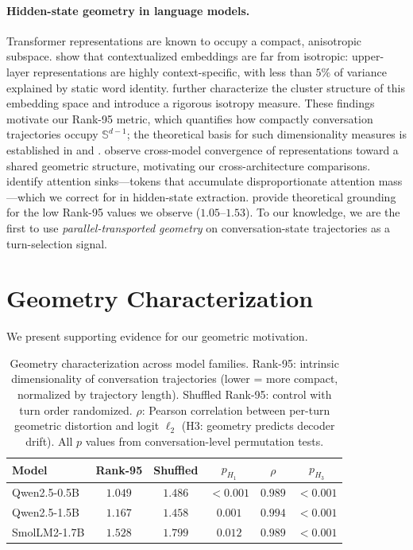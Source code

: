 \documentclass[11pt]{article}
\begin{document}
\paragraph{Hidden-state geometry in language models.}
Transformer representations are known to occupy a compact, anisotropic subspace.
\citet{ethayarajh-2019-contextual} show that contextualized embeddings are far
from isotropic: upper-layer representations are highly context-specific,
with less than $5\%$ of variance explained by static word identity.
\citet{cai-etal-2021-isotropy} further characterize the cluster structure of
this embedding space and introduce a rigorous isotropy measure.
These findings motivate our Rank-95 metric, which quantifies how compactly
conversation trajectories occupy $\mathbb{S}^{d-1}$;
the theoretical basis for such dimensionality measures is established in
\citet{li-etal-2018-measuring} and \citet{aghajanyan-etal-2021-intrinsic}.
\citet{huh-etal-2024-platonic} observe cross-model convergence of representations
toward a shared geometric structure, motivating our cross-architecture comparisons.
\citet{xiao-etal-2023-efficient} identify attention sinks---tokens that
accumulate disproportionate attention mass---which we correct for in
hidden-state extraction.
\citet{anagnostidis-etal-2022-signal} provide theoretical grounding
for the low Rank-95 values we observe ($1.05$--$1.53$).
To our knowledge, we are the first to use \emph{parallel-transported geometry}
on conversation-state trajectories as a turn-selection signal.

\section{Geometry Characterization}
\label{sec:geomchar}

We present supporting evidence for our geometric motivation.

\begin{table}[t]
\centering
\caption{Geometry characterization across model families.
Rank-95: intrinsic dimensionality of conversation trajectories
(lower = more compact, normalized by trajectory length).
Shuffled Rank-95: control with turn order randomized.
$\rho$: Pearson correlation between per-turn geometric distortion and
logit $\ell_2$ (H3: geometry predicts decoder drift).
All $p$ values from conversation-level permutation tests.}
\label{tab:geometry}
\begin{tabular}{lccccc}
\toprule
Model & Rank-95 & Shuffled & $p_{H_1}$ & $\rho$ & $p_{H_3}$ \\
\midrule
Qwen2.5-0.5B & $1.049$ & $1.486$ & $<0.001$ & $0.989$ & $<0.001$ \\
Qwen2.5-1.5B & $1.167$ & $1.458$ & $0.001$  & $0.994$ & $<0.001$ \\
SmolLM2-1.7B & $1.528$ & $1.799$ & $0.012$  & $0.989$ & $<0.001$ \\
\bottomrule
\end{tabular}
\end{table}
\end{document}
